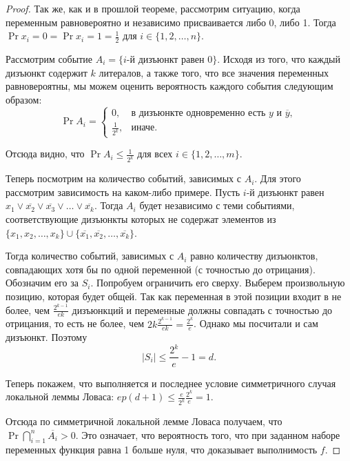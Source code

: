 \begin{proof}
    Так же, как и в прошлой теореме, рассмотрим ситуацию, когда переменным равновероятно и независимо присваивается либо 0, либо 1. Тогда \(\Pr{x_i = 0} = \Pr{x_i = 1} = \frac{1}{2}\) для \(i \in \{1, 2, \dots, n\}\). 
    
    Рассмотрим событие \(A_i = \{i\)-й дизъюнкт равен \(0\}\). Исходя из того, что каждый дизъюнкт содержит \(k\) литералов, а также того, что все значения переменных равновероятны, мы можем оценить вероятность каждого события следующим образом:
    \[\Pr{A_i} = \begin{cases}
    0,&\text{в дизъюнкте одновременно есть }y\text{ и }\overline{y}, \\
    \frac{1}{2^k},&\text{иначе}.
    \end{cases}\]
    
    Отсюда видно, что \(\Pr{A_i} \leq \frac{1}{2^k}\) для всех \(i \in \{1, 2, \dots, m\}\).
    
    Теперь посмотрим на количество событий, зависимых с \(A_i\). Для этого рассмотрим зависимость на каком-либо примере. Пусть \(i\)-й дизъюнкт равен \(x_1 \lor \overline{x_2} \lor \overline{x_3} \lor \dots \lor \overline{x_k}\). Тогда \(A_i\) будет независимо с теми событиями, соответствующие дизъюнкты которых не содержат элементов из \(\{x_1, x_2, \dots, x_k\} \cup \{\overline{x_1}, \overline{x_2}, \dots, \overline{x_k}\}\).
    
    Тогда количество событий, зависимых с \(A_i\) равно количеству дизъюнктов, совпадающих хотя бы по одной переменной (с точностью до отрицания). Обозначим его за \(S_i\). Попробуем ограничить его сверху. Выберем произвольную позицию, которая будет общей. Так как переменная в этой позиции входит в не более, чем \(\frac{2^{k-1}}{ek}\) дизъюнкций и переменные должны совпадать с точностью до отрицания, то есть не более, чем \(2k\frac{2^{k - 1}}{ek} = \frac{2^k}{e}\). Однако мы посчитали и сам дизъюнкт. Поэтому
    \[|S_i| \leq \frac{2^{k}}{e} - 1 = d.\]
    
    Теперь покажем, что выполняется и последнее условие симметричного случая локальной леммы Ловаса: \(ep(d + 1) \leq \frac{e}{2^k}\frac{2^k}{e} = 1.\)
    
    Отсюда по симметричной локальной лемме Ловаса получаем, что \(\Pr{\bigcap_{i = 1}^{n} \overline{A_i}} > 0\). Это означает, что вероятность того, что при заданном наборе переменных функция равна 1 больше нуля, что доказывает выполнимость \(f\).
\end{proof}

